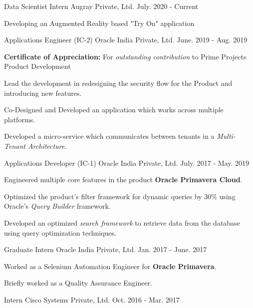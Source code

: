 \begin{cventries}
  \cventry
    {Data Scientist Intern}
    {Augray Private, Ltd.}
    {}
    {July. 2020 - Current}
    {
      \begin{cvitems}
        \item {Developing an Augmented Reality based "Try On" application}
      \end{cvitems}
    }
  \cventry
    {Applications Engineer (IC-2)}
    {Oracle India Private, Ltd.}
    {}
    {June. 2019 - Aug. 2019}
    {
      \begin{cvitems}
        \item {\textbf{Certificate of Appreciation:} For \textit{outstanding contribution} to Prime Projects Product Development}
        \item {Lead the development in redesigning the security flow for the Product and introducing new features.}
        \item {Co-Designed and Developed an application which works across multiple platforms.}
        \item {Developed a micro-service which communicates between tenants in a \textit{Multi-Tenant Architecture}.}
      \end{cvitems}
    }
  \cventry
    {Applications Developer (IC-1)}
    {Oracle India Private, Ltd.}
    {}
    {July. 2017 - May. 2019}
    {
      \begin{cvitems}
        \item {Engineered multiple core features in the product \textbf{Oracle Primavera Cloud}.}
        \item {Optimized the product's filter framework for dynamic queries by 30\% using Oracle's \textit{Query Builder} framework.}
        \item {Developed an optimized \textit{search framework} to retrieve data from the database using query optimization techniques.}
      \end{cvitems}
    }
  \cventry
    {Graduate Intern}
    {Oracle India Private, Ltd.}
    {}
    {Jan. 2017 - June. 2017}
    {
      \begin{cvitems}
        \item {Worked as a Selenium Automation Engineer for \textbf{Oracle Primavera}.}
        \item {Briefly worked as a Quality Assurance Engineer.}
      \end{cvitems}
    }
  \cventry
    {Intern}
    {Cisco Systems Private, Ltd.}
    {}
    {Oct. 2016 - Mar. 2017}

\end{cventries}
